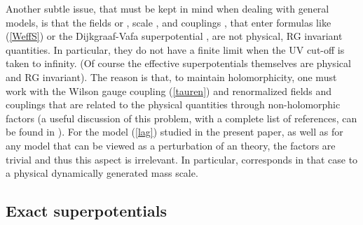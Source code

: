\documentclass[a4paper,12pt]{article}
\begin{document}
Another subtle issue, that must be kept in mind when dealing with
general \coordHE{} models, is that the fields \coordHE{} or \coordHE{}, scale
\myHighlight{$\L$}\coordHE{}, and couplings \coordHE{}, that enter formulas like (\ref{WeffS}) or
the Dijkgraaf-Vafa superpotential \coordHE{} \cite{DV}, are not physical,
RG invariant quantities. In particular, they do not have a finite limit
when the UV cut-off \coordHE{} is taken to infinity. (Of course the
effective superpotentials themselves are physical and RG invariant).
The reason is that, to maintain holomorphicity, one must work with the
Wilson gauge coupling (\ref{tauren}) and renormalized fields and
couplings that are related to the physical quantities through
non-holomorphic \coordHE{} factors (a useful discussion of this problem, with
a complete list of references, can be found in \cite{RR}). 
For the model (\ref{lag}) studied in the present paper,
as well as for any model that can be viewed as a
perturbation of an \coordHE{} theory, the \coordHE{} factors are trivial
and thus this aspect is irrelevant. In particular, \myHighlight{$\L$}\coordHE{} 
corresponds in that case to a physical dynamically generated mass scale.

%
\subsection{Exact superpotentials}
%
\end{document}
